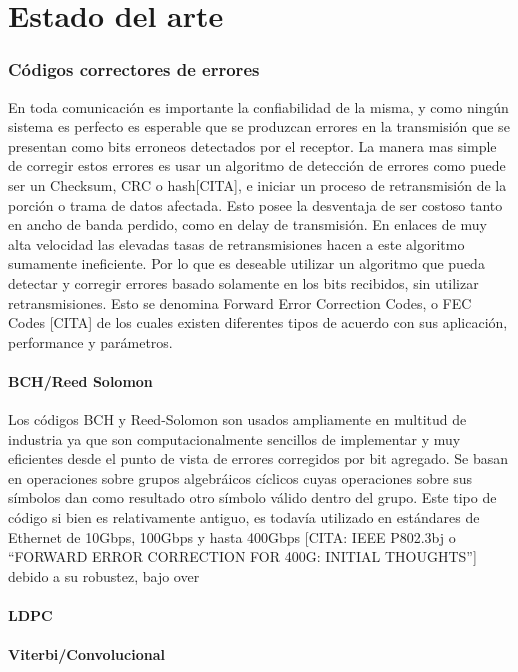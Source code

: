 \chapter{Estado del arte}

\subsection{Códigos correctores de errores}
En toda comunicación es importante la confiabilidad de la misma, y como ningún sistema es perfecto es esperable que se produzcan errores en la transmisión que se presentan como bits erroneos detectados por el receptor. 
La manera mas simple de corregir estos errores es usar un algoritmo de detección de errores como puede ser un Checksum, CRC o hash[CITA], e iniciar un proceso de retransmisión de la porción o trama de datos afectada. Esto posee la desventaja de ser costoso tanto en ancho de banda perdido, como en delay de transmisión. En enlaces de muy alta velocidad las elevadas tasas de retransmisiones hacen a este algoritmo sumamente ineficiente. 
Por lo que es deseable utilizar un algoritmo que pueda detectar y corregir errores basado solamente en los bits recibidos, sin utilizar retransmisiones. Esto se denomina Forward Error Correction Codes, o FEC Codes [CITA] de los cuales existen diferentes tipos de acuerdo con sus aplicación, performance y parámetros.

\subsubsection{BCH/Reed Solomon}
Los códigos BCH y Reed-Solomon son usados ampliamente en multitud de industria ya que son computacionalmente sencillos de implementar y muy eficientes desde el punto de vista de errores corregidos por bit agregado. Se basan en operaciones sobre grupos algebráicos cíclicos cuyas operaciones sobre sus símbolos dan como resultado otro símbolo válido dentro del grupo. 
Este tipo de código si bien es relativamente antiguo, es todavía utilizado en estándares de Ethernet de 10Gbps, 100Gbps y hasta 400Gbps [CITA: IEEE P802.3bj  o ``FORWARD ERROR CORRECTION FOR 400G: INITIAL THOUGHTS''] debido a su robustez, bajo over

\subsubsection{LDPC}

\subsubsection{Viterbi/Convolucional}

